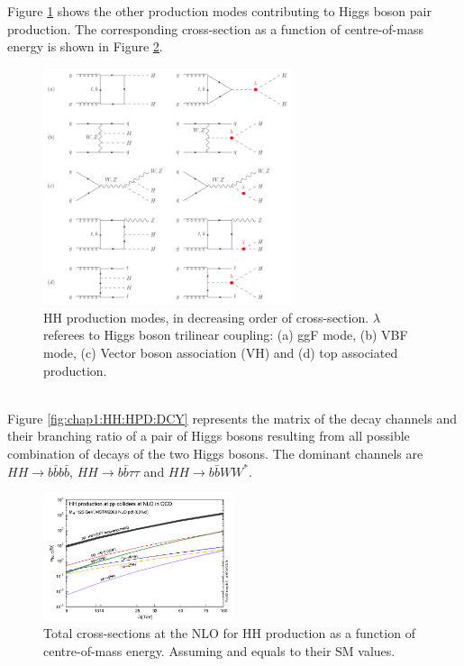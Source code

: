 Figure \ref{fig:chap1:HH:HPD:FYS} shows the other production modes contributing to Higgs boson pair production. The corresponding cross-section as a function of centre-of-mass energy is shown in Figure \ref{fig:chap1:HH:BSM:XSEC:S}.
\begin{figure}[htbp]
    \centering
    \includegraphics[width=0.65\textwidth]{Ch1/Img/HH_feyns.png}
    \caption{HH production modes, in decreasing order of cross-section. $\lambda$ referees to Higgs boson trilinear coupling: (a) ggF mode, (b) VBF mode, (c) Vector boson association (VH) and (d) top associated production.}
    \label{fig:chap1:HH:HPD:FYS}
\end{figure}
\\
Figure \ref{fig:chap1:HH:HPD:DCY} represents the matrix of the decay channels and their branching ratio of a pair of Higgs bosons resulting from all possible combination of decays of the two Higgs bosons. The dominant channels are $HH\rightarrow b\bar{b}b\bar{b}$, $HH\rightarrow b\bar{b}\tau\tau$ and $HH\rightarrow b\bar{b}WW^*$.
\begin{figure}[htbp]
    \centering
    \includegraphics[width=0.5\textwidth]{Ch1/Img/HH_XSec_as_S.png}
    \caption{Total cross-sections at the NLO for HH production as a function of centre-of-mass energy. Assuming \kl and \kt equals to their SM values.}
    \label{fig:chap1:HH:BSM:XSEC:S}
\end{figure}
